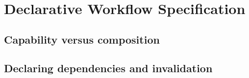 \section{Declarative Workflow Specification}
\label{sec:workflow}


\subsection{Capability versus composition}

\subsection{Declaring dependencies and invalidation}


